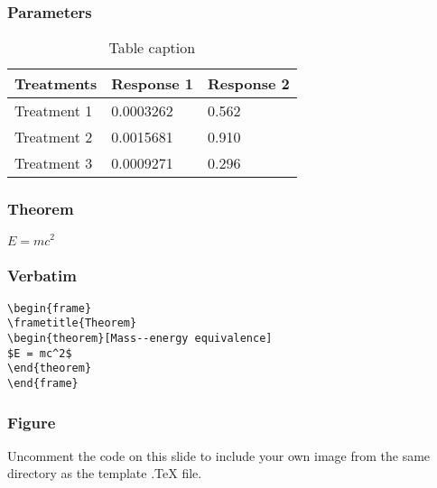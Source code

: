 \documentclass{beamer}
\begin{document}
\begin{frame}
\frametitle{Parameters}
\begin{table}
\begin{tabular}{l l l}
\toprule
\textbf{Treatments} & \textbf{Response 1} & \textbf{Response 2}\\
\midrule
Treatment 1 & 0.0003262 & 0.562 \\
Treatment 2 & 0.0015681 & 0.910 \\
Treatment 3 & 0.0009271 & 0.296 \\
\bottomrule
\end{tabular}
\caption{Table caption}
\end{table}
\end{frame}


\begin{frame}
\frametitle{Theorem}
\begin{theorem}
$E = mc^2$
\end{theorem}
\end{frame}


\begin{frame}[fragile] %
\frametitle{Verbatim}
\begin{example}
\begin{verbatim}
\begin{frame}
\frametitle{Theorem}
\begin{theorem}[Mass--energy equivalence]
$E = mc^2$
\end{theorem}
\end{frame}\end{verbatim}
\end{example}
\end{frame}


\begin{frame}
\frametitle{Figure}
Uncomment the code on this slide to include your own image from the same directory as the template .TeX file.
\end{frame}

\end{document}
